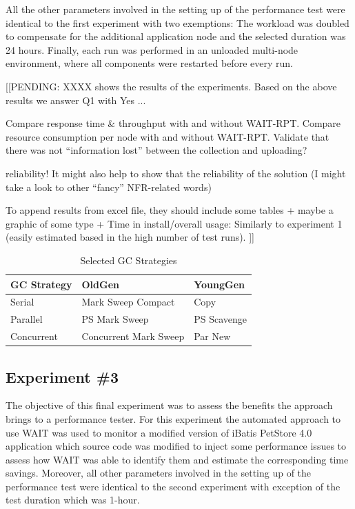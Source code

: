 \documentclass[runningheads,a4paper]{llncs}
\begin{document}
All the other parameters involved in the setting up of the performance test were
identical to the first experiment with two exemptions: The workload was
doubled to compensate for the additional application node and the
selected duration was 24 hours. Finally, each run was performed in an unloaded
multi-node environment, where all components were restarted before every
run.

[[PENDING: 
\figurename XXXX shows the results of the experiments.
Based on the above results we answer Q1 with Yes ...

Compare response time \& throughput with and without WAIT-RPT.
Compare resource consumption per node with and without WAIT-RPT.
Validate that there was not “information lost” between the collection and
uploading?

reliability! It might also help to show that the reliability of the solution
(I might take a look to other “fancy” NFR-related words)

To append results from excel file, they should include some tables
+ maybe a graphic of some type
+ Time in install/overall usage: Similarly to experiment 1 (easily estimated
based in the high number of test runs).
]]

\begin{table}[!h]
\caption{Selected GC Strategies}
\label{Selected_GCS}
\centering
\begin{tabular}{l|l|l}
\hline
\bfseries GC Strategy & \bfseries OldGen & \bfseries YoungGen\\
\hline
Serial & Mark Sweep Compact & Copy\\
Parallel & PS Mark Sweep & PS Scavenge\\
Concurrent & Concurrent Mark Sweep & Par New\\
\hline
\end{tabular}
\end{table}


\subsection{Experiment \#3}

The objective of this final experiment was to assess the benefits the approach
brings to a performance tester. For this experiment the automated approach to
use WAIT was used to monitor a modified version of iBatis PetStore 4.0 application 
which source code was modified to inject some performance issues to assess how 
WAIT was able to identify them and estimate the corresponding time savings.
Moreover, all other parameters involved in the setting up of the performance test 
were identical to the second experiment with exception of the test duration
which was 1-hour.
\end{document}
